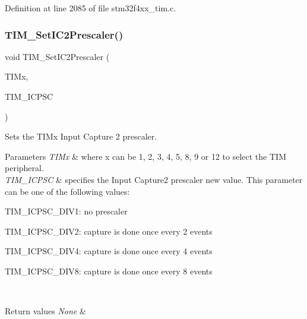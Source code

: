 Definition at line 2085 of file stm32f4xx\+\_\+tim.\+c.

\mbox{\label{group___t_i_m___group3_ga3cc4869b5fe73271808512c89322a325}} 
\subsubsection{\texorpdfstring{T\+I\+M\+\_\+\+Set\+I\+C2\+Prescaler()}{TIM\_SetIC2Prescaler()}}
{\footnotesize\ttfamily void T\+I\+M\+\_\+\+Set\+I\+C2\+Prescaler (\begin{DoxyParamCaption}\item[{\hyperlink{struct_t_i_m___type_def}{T\+I\+M\+\_\+\+Type\+Def} $\ast$}]{T\+I\+Mx,  }\item[{uint16\+\_\+t}]{T\+I\+M\+\_\+\+I\+C\+P\+SC }\end{DoxyParamCaption})}



Sets the T\+I\+Mx Input Capture 2 prescaler. 


\begin{DoxyParams}{Parameters}
{\em T\+I\+Mx} & where x can be 1, 2, 3, 4, 5, 8, 9 or 12 to select the T\+IM peripheral. \\
\hline
{\em T\+I\+M\+\_\+\+I\+C\+P\+SC} & specifies the Input Capture2 prescaler new value. This parameter can be one of the following values\+: \begin{DoxyItemize}
\item T\+I\+M\+\_\+\+I\+C\+P\+S\+C\+\_\+\+D\+I\+V1\+: no prescaler \item T\+I\+M\+\_\+\+I\+C\+P\+S\+C\+\_\+\+D\+I\+V2\+: capture is done once every 2 events \item T\+I\+M\+\_\+\+I\+C\+P\+S\+C\+\_\+\+D\+I\+V4\+: capture is done once every 4 events \item T\+I\+M\+\_\+\+I\+C\+P\+S\+C\+\_\+\+D\+I\+V8\+: capture is done once every 8 events \end{DoxyItemize}
\\
\hline
\end{DoxyParams}

\begin{DoxyRetVals}{Return values}
{\em None} & \\
\hline
\end{DoxyRetVals}


